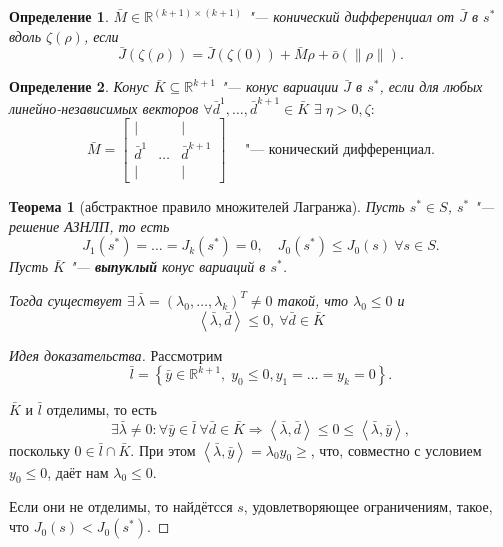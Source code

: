 \documentclass[12pt, a4paper]{article}
\theoremstyle{rusdef}
\newtheorem{definition}{Определение} %
\newtheorem{theorem}{Теорема}
\newcommand{\R}{\ensuremath{\mathbb{R}}} %
\renewcommand{\d}{\partial} %
\DeclareMathOperator*{\thus}{\Rightarrow} %
\begin{document}
\begin{definition}
  $\bar{M} \in \R^{(k+1) \times (k+1)}$ "--- конический дифференциал от $\bar{J}$ в $s^*$ вдоль $\zeta(\rho)$, если
  \[
    \bar{J}(\zeta(\rho)) = \bar{J}(\zeta(0)) + \bar{M}\rho + \bar{o}(\| \rho \|).
  \]
\end{definition}

\begin{definition}
  Конус $\bar{K} \subseteq \R^{k+1}$ "--- конус вариации $\bar{J}$ в $s^*$, если для любых линейно-независимых векторов
  ${\forall \bar{d}^1, \ldots, \bar{d}^{k+1} \in \bar{K}}$ ${\exists \; \eta > 0, \zeta \colon}$
  \[
    \bar{M} =
    \begin{bmatrix}
      |         &        & |             \\
      \bar{d}^1 & \ldots & \bar{d}^{k+1} \\
      |         &        & |
    \end{bmatrix}
    \quad \text{ "--- конический дифференциал}.
  \]
\end{definition}

\begin{theorem}[абстрактное правило множителей Лагранжа]
  Пусть $s^* \in S$, $s^*$ "--- решение АЗНЛП, то есть
  \[
    J_1(s^*) = \ldots = J_k(s^*) = 0, \quad J_0(s^*) \leqslant J_0(s) \: \forall s \in S.
  \]
  Пусть $\bar{K}$ "--- \textbf{выпуклый} конус вариаций в $s^*$.

  Тогда существует ${\exists\, \bar{\lambda} = (\lambda_0, \ldots, \lambda_k)^T \neq 0}$ такой, что ${\lambda_0 \leqslant 0}$ и
  \[
    {\left< \bar{\lambda}, \bar{d} \right>} \leqslant 0, \: \forall \bar{d} \in \bar{K}
  \]
\end{theorem}

\begin{proof}[Идея доказательства]
  Рассмотрим
  \[
    \bar{l} = \left\{ \bar{y} \in \R^{k+1}, \; y_0 \leqslant 0, y_1 = \ldots = y_k = 0 \right\}.
  \]

  $\bar{K}$ и $\bar{l}$ отделимы, то есть
  \[
    \exists \bar{\lambda} \neq 0 \colon \forall \bar{y} \in \bar{l} \:\forall
    \bar{d} \in \bar{K} \thus \left< \bar{\lambda}, \bar{d} \right> \leqslant 0 \leqslant \left< \bar{\lambda}, \bar{y} \right>,
  \]
  поскольку $0 \in \bar{l} \cap \bar{K}$. При этом $\left< \bar{\lambda}, \bar{y} \right> = \lambda_0 y_0 \geqslant$, что, совместно с условием $y_0 \leqslant 0$, даёт нам $\lambda_0 \leqslant 0$.

  Если они не отделимы, то найдётсся $s$, удовлетворяющее ограничениям, такое, что $J_0(s) < J_0(s^*)$.
\end{proof}
\end{document}

